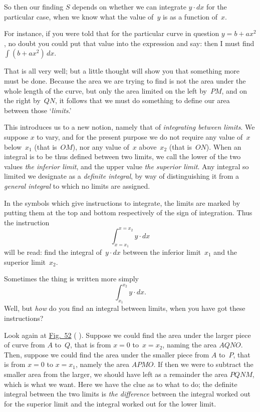 \documentclass[12pt]{book}[2005/09/16]
\newcommand{\ds}{\displaystyle}
\newcommand{\DPPageSep}[2]{\Pagelabel{#2}}
\newcommand{\Pagelabel}[1]
  {\phantomsection\label{#1}}
\newcommand{\Pageref}[2][p.]{%
  \ifthenelse{\not\equal{#1}{}}{%
    \hyperref[#2]{#1~\pageref*{#2}}%
  }{%
    \hyperref[#2]{\pageref{*#2}}%
  }%
}
\newcommand{\Fig}[1]{\hyperref[fig:#1]{Fig.~#1}}
\begin{document}
So then our finding $S$ depends on whether we can
\DPPageSep{220.png}{208}%
integrate $y · dx$ for the particular case, when we know
what the value of~$y$ is as a function of~$x$.

For instance, if you were told that for the particular
curve in question $y = b + ax^2$, no doubt you could put
that value into the expression and say: then I must
find $\ds\int (b + ax^2)\, dx$. %

That is all very well; but a little thought will show
you that something more must be done. Because the
area we are trying to find is not the area under the
whole length of the curve, but only the area limited
on the left by~$PM$, and on the right by~$QN$, it follows
that we must do something to define our area between
those `\emph{limits}.'\Pagelabel{limits} %

This introduces us to a new notion, namely that of
\emph{integrating between limits}. We suppose $x$ to vary,
and for the present purpose we do not require any
value of~$x$ below~$x_1$ (that is~$OM$), nor any value of~$x$
above~$x_2$ (that is~$ON$). When an integral is to be
thus defined between two limits, we call the lower
of the two values \emph{the inferior limit}, and the upper
value \emph{the superior limit}. Any integral so limited
we designate as a \emph{definite integral}, by way of distinguishing
it from a \emph{general integral} to which no
limits are assigned.

In the symbols which give instructions to integrate,
the limits are marked by putting them at the top
and bottom respectively of the sign of integration.
Thus the instruction
\[
\int_{x=x_1}^{x=x_2} y · dx
\]
\DPPageSep{221.png}{209}%
will be read: find the integral of~$y · dx$ between the
inferior limit~$x_1$ and the superior limit~$x_2$.

Sometimes the thing is written more simply
\[
\int^{x_2}_{x_1} y · dx.
\]
Well, but \emph{how} do you find an integral between limits,
when you have got these instructions?

Look again at \Fig{52} (\Pageref{fig:52}). Suppose we could %
find the area under the larger piece of curve from
$A$ to~$Q$, that is from $x = 0$ to~$x = x_2$, naming the area
$AQNO$. Then, suppose we could find the area under
the smaller piece from $A$ to~$P$, that is from $x = 0$ to
$x = x_1$, namely the area $APMO$. If then we were to
subtract the smaller area from the larger, we should
have left as a remainder the area $PQNM$, which is
what we want. Here we have the clue as to what
to do; the definite integral between the two limits is
\emph{the difference} between the integral worked out for
the superior limit and the integral worked out for the
lower limit.
\end{document}
